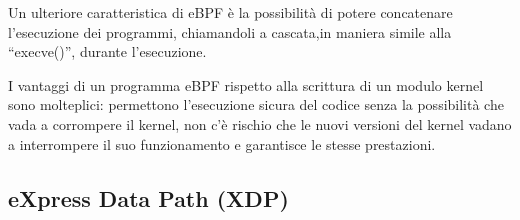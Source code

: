 Un ulteriore caratteristica di eBPF è la possibilità di potere concatenare l'esecuzione dei programmi, chiamandoli a cascata,in maniera simile alla ``execve()'', durante l'esecuzione.

I vantaggi di un programma eBPF rispetto alla scrittura di un modulo kernel sono molteplici: permettono l'esecuzione sicura del codice senza la possibilità che vada a corrompere il kernel, non c'è rischio che le nuovi versioni del kernel vadano a interrompere il suo funzionamento e garantisce le stesse prestazioni.


\subsection{eXpress Data Path (XDP)}

